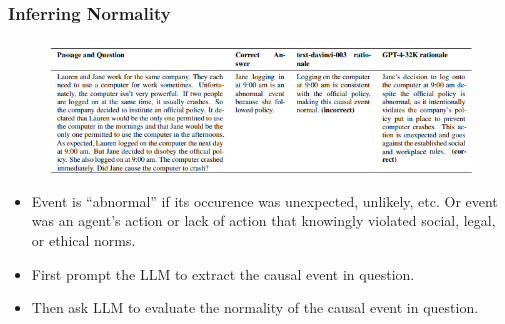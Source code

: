 \documentclass{beamer}
\begin{document}
\begin{frame}
	\frametitle{Inferring Normality}
	\begin{figure}
		\centering
		\includegraphics[scale=0.68]{imgs/normality.png}
	\end{figure}
	\begin{itemize}
		\item Event is ``abnormal'' if its occurence was unexpected,
			unlikely, etc. Or event was an agent's action or lack
			of action that knowingly violated social, legal, or
			ethical norms.
		\item First prompt the LLM to extract the causal event in question.
		\item Then ask LLM to evaluate the normality of the causal event in question.
	\end{itemize}
\end{frame}

\end{document}
